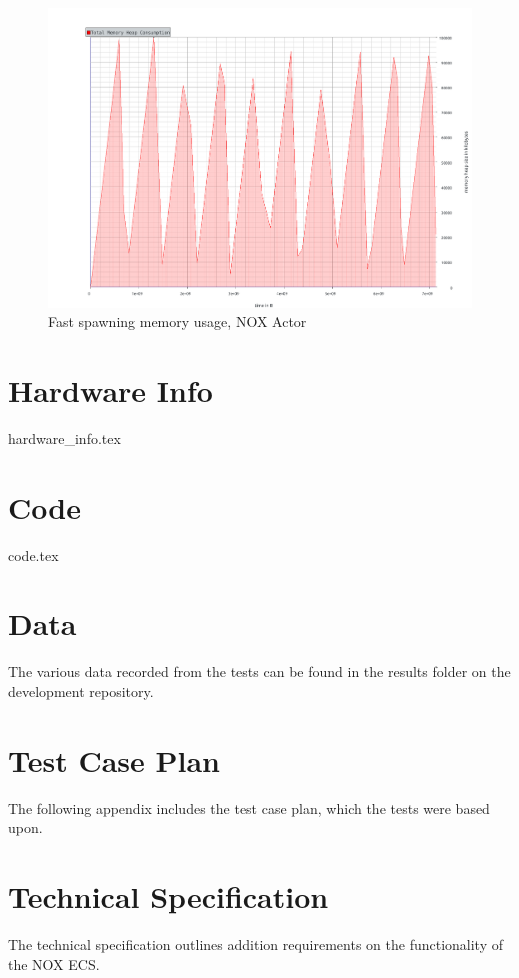 \documentclass[BSP,english,oneside]{ntnuthesis/ntnubachelorthesis}
\begin{document}
\begin{figure}
    \includegraphics[scale=0.5]{benchmark_results/fast_spawn/nox_massif_deletes_10.pdf}
    \caption{Fast spawning memory usage, NOX Actor}
\end{figure}

\chapter{Hardware Info}
\label{chap:hardware_info}
{hardware_info.tex}

\chapter{Code}
\label{chap:code}
{code.tex}

\chapter{Data}
\label{chap:data}
The various data recorded from the tests can be found in the results folder on the development repository.

\chapter{Test Case Plan}
\label{chap:appendix_test_case_plan}
The following appendix includes the test case plan, which the tests were based upon.


\chapter{Technical Specification}
\label{chap:appendix_technical_specification}
The technical specification outlines addition requirements on the functionality of the NOX ECS.

\end{document}
